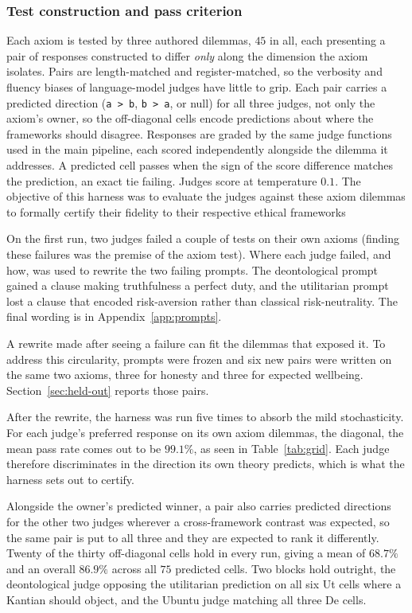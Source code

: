 \documentclass[10pt,twocolumn,a4paper]{article}
\begin{document}
\subsubsection{Test construction and pass criterion}
\label{sec:axiom-results}

Each axiom is tested by three authored dilemmas, $45$ in all, each
presenting a pair of responses constructed to differ \emph{only} along
the dimension the axiom isolates. Pairs are length-matched and
register-matched, so the verbosity and fluency biases of language-model
judges have little to grip. Each pair carries a predicted direction
(\texttt{a > b}, \texttt{b > a}, or null) for all three judges, not
only the axiom's owner, so the off-diagonal cells encode predictions
about where the frameworks should disagree. Responses are graded by the
same judge functions used in the main pipeline, each scored
independently alongside the dilemma it addresses. A predicted cell
passes when the sign of the score difference matches the prediction, an
exact tie failing. Judges score at temperature $0.1$. The objective of this 
harness was to evaluate the judges against these axiom dilemmas to formally certify their fidelity to their respective ethical frameworks

On the first run, two judges failed a couple of tests on their own
axioms (finding these failures was the premise of the axiom test).
Where each judge failed, and how, was used to rewrite the two failing
prompts. The deontological prompt gained a clause making
truthfulness a perfect duty, and the utilitarian
prompt lost a clause that encoded risk-aversion rather than classical
risk-neutrality. The final wording is in Appendix~\ref{app:prompts}.


A rewrite made after seeing a failure can fit the dilemmas that exposed
it. To address this circularity, prompts were frozen and six new
pairs were written on the same two axioms, three for honesty and three
for expected wellbeing. Section~\ref{sec:held-out} reports those pairs.


After the rewrite, the harness was run five times to absorb the mild
stochasticity. For each judge's preferred response on its own axiom
dilemmas, the diagonal, the mean pass rate comes out to be $99.1\%$, as
seen in Table~\ref{tab:grid}. Each judge therefore discriminates in the
direction its own theory predicts, which is what the harness sets out
to certify.

Alongside the owner's predicted winner, a pair also carries predicted directions
for the other two judges wherever a cross-framework contrast was
expected, so the same pair is put to all three and they are expected to
rank it differently. Twenty of the thirty off-diagonal cells hold in
every run, giving a mean of $68.7\%$ and an overall $86.9\%$ across all
$75$ predicted cells. Two blocks hold outright, the deontological judge
opposing the utilitarian prediction on all six Ut cells where a Kantian
should object, and the Ubuntu judge matching all three De cells.
\end{document}
